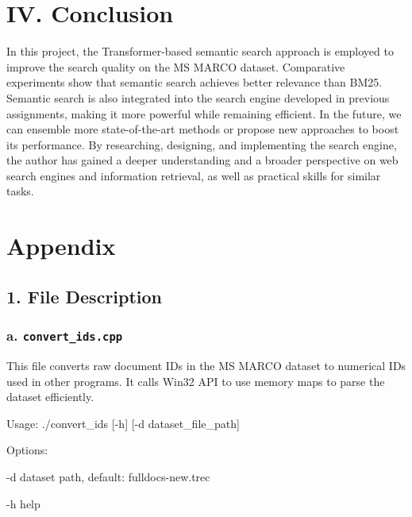 \documentclass[11pt]{article}
\newenvironment{Shaded}{}{}
\newcommand{\ExtensionTok}[1]{#1}
\newcommand{\NormalTok}[1]{#1}
\begin{document}
\hypertarget{iv-conclusion}{%
\section{IV. Conclusion}\label{iv-conclusion}}

In this project, the Transformer-based semantic search approach is
employed to improve the search quality on the MS MARCO dataset.
Comparative experiments show that semantic search achieves better
relevance than BM25. Semantic search is also integrated into the search
engine developed in previous assignments, making it more powerful while
remaining efficient. In the future, we can ensemble more
state-of-the-art methods or propose new approaches to boost its
performance. By researching, designing, and implementing the search
engine, the author has gained a deeper understanding and a broader
perspective on web search engines and information retrieval, as well as
practical skills for similar tasks.

\hypertarget{appendix}{%
\section{Appendix}\label{appendix}}

\hypertarget{1-file-description}{%
\subsection{1. File Description}\label{1-file-description}}

\hypertarget{a-convertidscpp}{%
\subsubsection{a.
\texttt{convert\_ids.cpp}}\label{a-convertidscpp}}

This file converts raw document IDs in the MS MARCO dataset to numerical
IDs used in other programs. It calls Win32 API to use memory maps to
parse the dataset efficiently.

\begin{Shaded}
\begin{Highlighting}[]
\ExtensionTok{Usage:}\NormalTok{ ./convert\_ids [{-}h] [{-}d dataset\_file\_path]
}
\ExtensionTok{Options:
}
        \ExtensionTok{{-}d}\NormalTok{      dataset path, default: fulldocs{-}new.trec
}
        \ExtensionTok{{-}h}\NormalTok{      help}
\end{Highlighting}
\end{Shaded}
\end{document}
